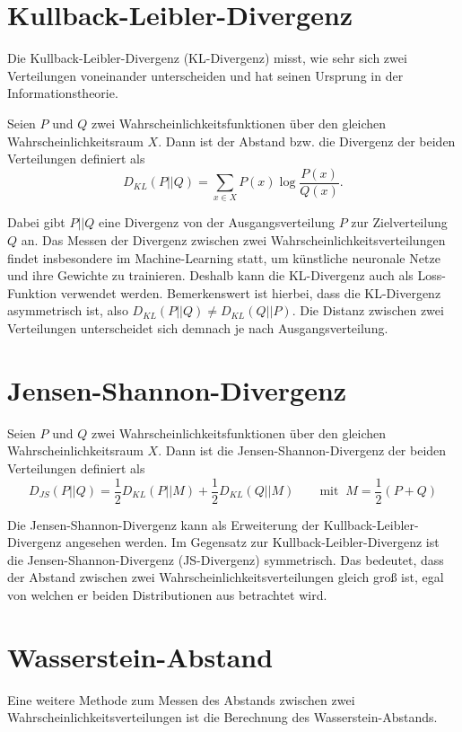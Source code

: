 \section{Kullback-Leibler-Divergenz}
Die Kullback-Leibler-Divergenz (KL-Divergenz) misst, wie sehr sich zwei
Verteilungen voneinander unterscheiden und hat seinen Ursprung in der
Informationstheorie. 
\begin{definition}
Seien $P$ und $Q$ zwei Wahrscheinlichkeitsfunktionen über den gleichen
Wahrscheinlichkeitsraum $X$. Dann ist der Abstand bzw. die Divergenz der
beiden Verteilungen definiert als
\[
    D_{KL}(P \lvert\lvert Q) = \sum_{x \in X} P(x) \log \frac{P(x)}{Q(x)}.
\]
\end{definition}
Dabei gibt $P \lvert\lvert Q$ eine Divergenz von der Ausgangsverteilung $P$
zur Zielverteilung $Q$ an. Das Messen der Divergenz zwischen zwei
Wahrscheinlichkeitsverteilungen findet insbesondere im Machine-Learning statt,
um künstliche neuronale Netze und ihre Gewichte zu trainieren. Deshalb kann
die KL-Divergenz auch als Loss-Funktion verwendet werden. Bemerkenswert ist
hierbei, dass die KL-Divergenz asymmetrisch ist, also $D_{KL}(P \lvert\lvert
Q) \neq D_{KL}(Q \lvert\lvert P)$. Die Distanz zwischen zwei Verteilungen
unterscheidet sich demnach je nach Ausgangsverteilung.

\section{Jensen-Shannon-Divergenz}
\begin{definition}
Seien $P$ und $Q$ zwei Wahr\-schein\-lichkeitsfunktionen über den gleichen
Wahrscheinlichkeitsraum $X$. Dann ist die Jensen-Shannon-Divergenz der
beiden Verteilungen definiert als
\[
    D_{JS}(P \lvert\lvert Q) = \frac{1}{2} D_{KL}(P \lvert\lvert M) + \frac{1}{2} D_{KL}(Q \lvert\lvert M) \quad\quad \text{mit} \;\; M = \frac{1}{2}(P + Q)
\]
\end{definition}
Die Jensen-Shannon-Divergenz kann als Erweiterung der
Kullback-Leibler-Divergenz angesehen werden. Im Gegensatz zur
Kullback-Leibler-Divergenz ist die Jensen-Shannon-Divergenz (JS-Divergenz)
symmetrisch. Das bedeutet, dass der Abstand zwischen zwei
Wahrscheinlichkeitsverteilungen gleich groß ist, egal von welchen er beiden
Distributionen aus betrachtet wird.

\section{Wasserstein-Abstand}
Eine weitere Methode zum Messen des Abstands zwischen zwei
Wahrscheinlichkeitsverteilungen ist die Berechnung des Wasserstein-Abstands.


